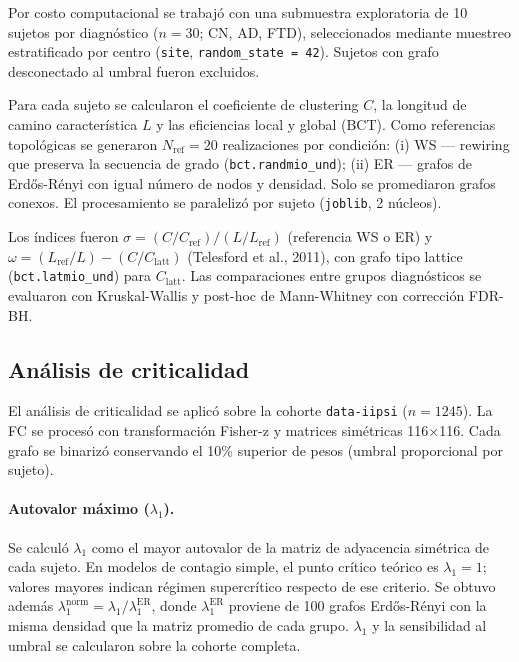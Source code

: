 \documentclass[12pt,a4paper]{article}
\begin{document}
Por costo computacional se trabajó con una submuestra exploratoria de 10 sujetos por
diagnóstico ($n = 30$; CN, AD, FTD), seleccionados mediante muestreo estratificado por
centro (\texttt{site}, \texttt{random\_state = 42}). Sujetos con grafo desconectado al umbral
fueron excluidos.

Para cada sujeto se calcularon el coeficiente de clustering $C$, la longitud de camino
característica $L$ y las eficiencias local y global (BCT). Como referencias topológicas se
generaron $N_{\text{ref}} = 20$ realizaciones por condición: (i) WS --- rewiring que
preserva la secuencia de grado (\texttt{bct.randmio\_und}); (ii) ER --- grafos de
Erd\H{o}s-R\'enyi con igual número de nodos y densidad. Solo se promediaron grafos conexos.
El procesamiento se paralelizó por sujeto (\texttt{joblib}, 2 núcleos).

Los índices fueron
$\sigma = (C/C_{\text{ref}})/(L/L_{\text{ref}})$ (referencia WS o ER) y
$\omega = (L_{\text{ref}}/L) - (C/C_{\text{latt}})$ (Telesford et al., 2011), con grafo tipo
lattice (\texttt{bct.latmio\_und}) para $C_{\text{latt}}$. Las comparaciones entre grupos
diagnósticos se evaluaron con Kruskal-Wallis y post-hoc de Mann-Whitney con corrección
FDR-BH.

\subsection{Análisis de criticalidad}

El análisis de criticalidad se aplicó sobre la cohorte \texttt{data-iipsi} ($n = 1245$).
La FC se procesó con transformación Fisher-z y matrices simétricas 116$\times$116. Cada grafo
se binarizó conservando el 10\% superior de pesos (umbral proporcional por sujeto).

\paragraph{Autovalor máximo ($\lambda_1$).} Se calculó $\lambda_1$ como el mayor autovalor de la
matriz de adyacencia simétrica de cada sujeto. En modelos de contagio simple, el punto crítico
teórico es $\lambda_1 = 1$; valores mayores indican régimen supercrítico respecto de ese
criterio. Se obtuvo además $\lambda_1^{\text{norm}} = \lambda_1 / \lambda_1^{\text{ER}}$,
donde $\lambda_1^{\text{ER}}$ proviene de 100 grafos Erd\H{o}s-R\'enyi con la misma densidad
que la matriz promedio de cada grupo. $\lambda_1$ y la sensibilidad al umbral se calcularon
sobre la cohorte completa.
\end{document}
